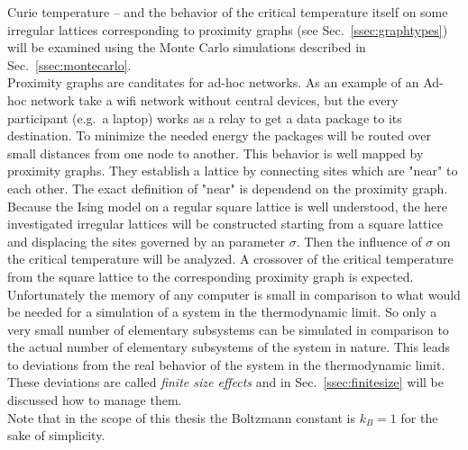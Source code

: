 Curie temperature -- and the behavior of the critical temperature itself
on some irregular lattices corresponding to proximity graphs
(see Sec.\ \ref{ssec:graphtypes}) will be examined using the Monte
Carlo simulations described in Sec.\ \ref{ssec:montecarlo}.\\
Proximity graphs are canditates for ad-hoc networks. As an example of an
Ad-hoc network take a wifi network without central devices, but the every
participant (e.g.\ a laptop) works as a relay to get a data package to its
destination. To minimize the needed energy the packages will be routed
over small distances from one node to another. This behavior is well mapped
by proximity graphs. They establish a lattice by connecting sites which
are "near" to each other. The exact definition of "near" is dependend on
the proximity graph.\\
Because the Ising model on a regular square lattice is well understood,
the here investigated irregular lattices will be constructed starting from
a square lattice and displacing the sites governed by an parameter \(\sigma\).
Then the influence of \(\sigma\) on the critical temperature will be
analyzed. A crossover of the critical temperature from the square lattice
to the corresponding proximity graph is expected.\\

Unfortunately the memory of any computer is small in comparison to what
would be needed for a simulation of a system in the
thermodynamic limit. So only a very small number of elementary subsystems can be
simulated in comparison to the actual number of elementary subsystems
of the system in nature. This leads to deviations from the real behavior
of the system in the thermodynamic limit. These deviations are called
\emph{finite size effects} and in Sec.\ \ref{ssec:finitesize} will be
discussed how to manage them.\\

Note that in the scope of this thesis the Boltzmann constant is \(k_{B}=1\)
for the sake of simplicity.

